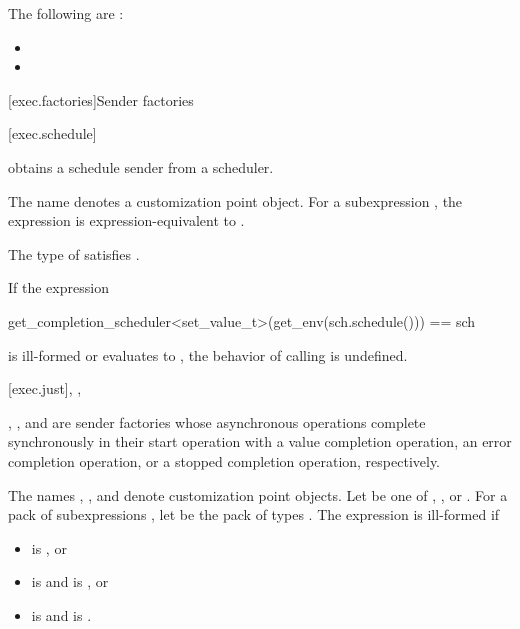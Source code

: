 \mandates
The following are :
\begin{itemize}
\item
{}
\item
{}
\end{itemize}

[exec.factories]{Sender factories}

[exec.schedule]{}

\pnum
{} obtains a schedule sender
from a scheduler.

\pnum
The name  denotes a customization point object.
For a subexpression ,
the expression  is expression-equivalent to
.

\pnum
\mandates
The type of  satisfies .

\pnum
If the expression
\begin{codeblock}
get_completion_scheduler<set_value_t>(get_env(sch.schedule())) == sch
\end{codeblock}
is ill-formed or evaluates to ,
the behavior of calling  is undefined.

[exec.just]{, , }

\pnum
{}, , and  are sender factories
whose asynchronous operations complete synchronously in their start operation
with a value completion operation,
an error completion operation, or
a stopped completion operation, respectively.

\pnum
The names , , and  denote
customization point objects.
Let  be one of
, , or .
For a pack of subexpressions ,
let  be the pack of types .
The expression  is ill-formed if
\begin{itemize}
\item
{} is , or
\item
{} is  and
 is , or
\item
{} is  and
 is .
\end{itemize}

